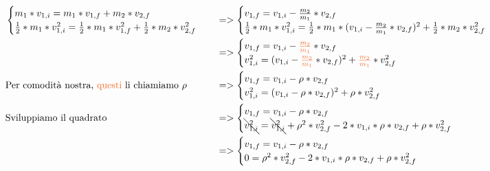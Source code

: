                     \begin{align*}
                        &\begin{cases}
                            m_1*v_{1, i}=m_1*v_{1, f}+m_2*v_{2, f}\\
                            \frac{1}{2}*m_1*v^2_{1, i}=\frac{1}{2}*m_1*v^2_{1, f}+\frac{1}{2}*m_2*v^2_{2, f}
                        \end{cases}&&=>
                        \begin{cases}
                            v_{1, f}=v_{1, i}-\frac{m_2}{m_1}*v_{2, f}\\
                            \frac{1}{2}*m_1*v^2_{1, i}=\frac{1}{2}*m_1*(v_{1, i}-\frac{m_2}{m_1}*v_{2, f})^2+\frac{1}{2}*m_2*v^2_{2, f}
                        \end{cases}\\
                        & &&=>
                        \begin{cases}
                            v_{1, f}=v_{1, i}-\textcolor{Orange}{\frac{m_2}{m_1}}*v_{2, f}\\
                            v^2_{1, i}=(v_{1, i}-\textcolor{Orange}{\frac{m_2}{m_1}}*v_{2, f})^2+\textcolor{Orange}{\frac{m_2}{m_1}}*v^2_{2, f}
                        \end{cases}\\
                        & \textrm{Per comodità nostra, \textcolor{Orange}{questi} li chiamiamo }\rho &&=>
                        \begin{cases}
                            v_{1, f}=v_{1, i}-\rho*v_{2, f}\\
                            v^2_{1, i}=(v_{1, i}-\rho*v_{2, f})^2+\rho*v^2_{2, f}
                        \end{cases}\\
                        & \textrm{Sviluppiamo il quadrato } &&=>
                        \begin{cases}
                            v_{1, f}=v_{1, i}-\rho*v_{2, f}\\
                            \bcancel{v^2_{1, i}}= \bcancel{v^2_{1, i}} +\rho^2*v^2_{2, f}-2*v_{1, i}*\rho*v_{2, f} +\rho*v^2_{2, f}
                        \end{cases}\\
                        & &&=>
                        \begin{cases}
                            v_{1, f}=v_{1, i}-\rho*v_{2, f}\\
                            0 =\rho^2*v^2_{2, f}-2*v_{1, i}*\rho*v_{2, f} +\rho*v^2_{2, f}

\end{cases}
\end{align*}

